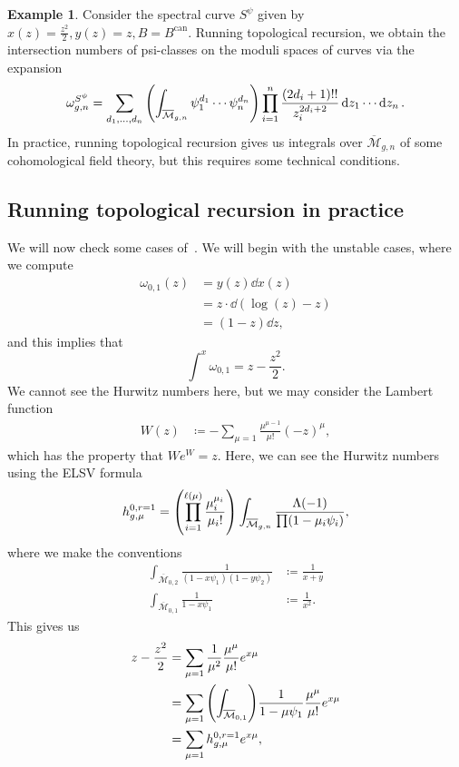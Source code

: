 \documentclass[leqno, openany]{memoir}
\theoremstyle{definition}
\newtheorem{exm}[thm]{Example}
\theoremstyle{remark}
\theoremstyle{plain}
\theoremstyle{definition}
\theoremstyle{remark}
\newcommand{\mc}[1]{\mathcal{#1}}
\newcommand{\mr}[1]{\mathrm{#1}}
\newcommand{\ol}[1]{\overline{#1}}
\begin{document}
\begin{exm}
  Consider the spectral curve $S^{\psi}$ given by $x(z) = \frac{z^2}{2}, y(z) = z, B = B^{\mr{can}}$. Running topological recursion, we obtain the intersection numbers of psi-classes on the moduli spaces of curves via the expansion
  \[ \omega_{g,n}^{S^{\psi}} = \sum_{d_1, \ldots, d_n} \qty(\int_{\ol{\mc{M}}_{g,n}} \psi_1^{d_1} \cdots \psi_n^{d_n}) \prod_{i=1}^n \frac{(2d_i+1)!!}{z_i^{2d_i+2}} \dd{z_1} \cdots \dd{z_n}. \]
  In practice, running topological recursion gives us integrals over $\ol{\mc{M}}_{g,n}$ of some cohomological field theory, but this requires some technical conditions.
\end{exm}

\subsection{Running topological recursion in practice}
\label{subsec:running}

We will now check some cases of~. We will begin with the unstable cases, where we compute
\begin{align*}
  \omega_{0,1}(z) &= y(z) \dd{x(z)} \\
                  &= z \cdot \dd(\log(z)-z) \\
  &= (1-z) \dd{z},
\end{align*}
and this implies that
\[ \int^x \omega_{0,1} = z- \frac{z^2}{2}. \]
We cannot see the Hurwitz numbers here, but we may consider the Lambert function
\begin{align*}
  W(z) &\coloneqq -\sum_{\mu=1} \frac{\mu^{\mu-1}}{\mu!}(-z)^{\mu}, 
\end{align*}
which has the property that $We^W = z$. Here, we can see the Hurwitz numbers using the ELSV formula
\[ h_{g,\mu}^{0,r=1} = \qty(\prod_{i=1}^{\ell(\mu)} \frac{\mu_i^{\mu_i}}{\mu_i!}) \int_{\ol{\mc{M}}_{g,n}} \frac{\Lambda(-1)}{\prod (1-\mu_i \psi_i)}, \]
where we make the conventions
\begin{align*}
\int_{\ol{\mc{M}}_{0,2}} \frac{1}{(1-x\psi_1)(1-y\psi_2)} &\coloneqq \frac{1}{x+y} \\
\int_{\ol{\mc{M}}_{0,1}} \frac{1}{1-x\psi_1} &\coloneqq \frac{1}{x^2}.
\end{align*}
This gives us
\begin{align*}
      z-\frac{z^2}{2} &= \sum_{\mu=1} \frac{1}{\mu^2} \frac{\mu^{\mu}}{\mu!} e^{x\mu} \\
       &= \sum_{\mu=1} \qty(\int_{\ol{\mc{M}}_{0,1}}) \frac{1}{1-\mu \psi_1} \frac{\mu^{\mu}}{\mu!} e^{x\mu} \\
       &= \sum_{\mu=1} h_{g,\mu}^{0,r=1} e^{x\mu},
\end{align*}
\end{document}
